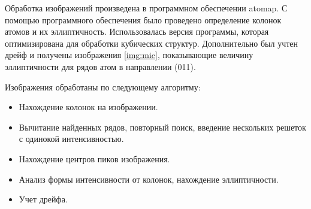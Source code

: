 Обработка изображений произведена в программном обеспечении atomap\cite{Nord2017}. С помощью программного обеспечения было проведено определение колонок атомов и их эллиптичность. Использовалась версия программы, которая оптимизирована для обработки кубических структур. Дополнительно был учтен дрейф и получены изображения \ref{img:mic}, показывающие величину эллиптичности для рядов атом в направлении (011).

Изображения обработаны по следующему алгоритму:
\begin{itemize}
\item Нахождение колонок на изображении.

\item Вычитание найденных рядов, повторный поиск, введение нескольких решеток с одинокой интенсивностью.

\item Нахождение центров пиков изображения.

\item Анализ формы интенсивности от колонок, нахождение эллиптичности.

\item Учет дрейфа.
\end{itemize}

